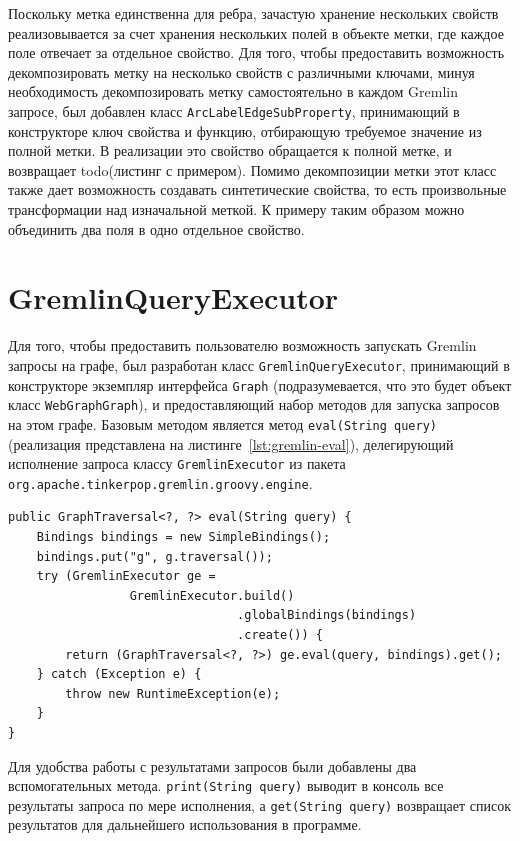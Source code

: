 \documentclass[times,specification,annotation]{itmo-student-thesis}
\begin{document}
Поскольку метка единственна для ребра, зачастую хранение нескольких свойств реализовывается за счет хранения нескольких полей в объекте метки, где каждое поле отвечает за отдельное свойство. Для того, чтобы предоставить возможность декомпозировать метку на несколько свойств с различными ключами, минуя необходимость декомпозировать метку самостоятельно в каждом Gremlin запросе, был добавлен класс \texttt{ArcLabelEdgeSubProperty}, принимающий в конструкторе ключ свойства и функцию, отбирающую требуемое значение из полной метки. В реализации это свойство обращается к полной метке, и возвращает todo(листинг с примером). Помимо декомпозиции метки этот класс также дает возможность создавать синтетические свойства, то есть произвольные трансформации над изначальной меткой. К примеру таким образом можно объединить два поля в одно отдельное свойство.

\section{GremlinQueryExecutor}

Для того, чтобы предоставить пользователю возможность запускать Gremlin запросы на графе, был разработан класс \texttt{GremlinQueryExecutor}, принимающий в конструкторе экземпляр интерфейса \texttt{Graph} (подразумевается, что это будет объект класс \texttt{WebGraphGraph}), и предоставляющий набор методов для запуска запросов на этом графе. Базовым методом является метод \texttt{eval(String query)} (реализация представлена на листинге~\ref{lst:gremlin-eval}), делегирующий исполнение запроса классу \texttt{GremlinExecutor} из пакета \texttt{org.apache.tinkerpop.gremlin.groovy.engine}.

\begin{lstlisting}[float=!h,caption={Реализация исполнителя Gremlin запросов},label={lst:gremlin-eval}]
public GraphTraversal<?, ?> eval(String query) {
    Bindings bindings = new SimpleBindings();
    bindings.put("g", g.traversal());
    try (GremlinExecutor ge =
                 GremlinExecutor.build()
                                .globalBindings(bindings)
                                .create()) {
        return (GraphTraversal<?, ?>) ge.eval(query, bindings).get();
    } catch (Exception e) {
        throw new RuntimeException(e);
    }
}
\end{lstlisting}

Для удобства работы с результатами запросов были добавлены два вспомогательных метода. \texttt{print(String query)} выводит в консоль все результаты запроса по мере исполнения, а \texttt{get(String query)} возвращает список результатов для дальнейшего использования в программе.
\end{document}
